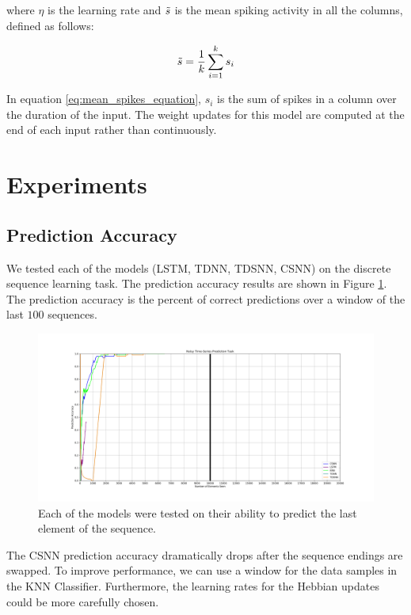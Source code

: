 \documentclass{article}
\begin{document}
where $\eta$ is the learning rate and $\Tilde{s}$ is the mean spiking activity in all the columns, defined as follows:

\begin{equation}
    \Tilde{s} = \frac{1}{k} \sum_{i = 1}^{k}{s_i}
    \label{eq:mean_spikes_equation}
\end{equation}

In equation \ref{eq:mean_spikes_equation}, $s_i$ is the sum of spikes in a column over the duration of the input. The weight updates for this model are computed at the end of each input rather than continuously.


\section*{Experiments}

\subsection*{Prediction Accuracy}

We tested each of the models (LSTM, TDNN, TDSNN, CSNN) on the discrete sequence learning task. The prediction accuracy results are shown in Figure \ref{fig:prediction-accuracy}. The prediction accuracy is the percent of correct predictions over a window of the last $100$ sequences.

\begin{figure}[!h]
    \centering
    \includegraphics[width=0.9\linewidth]{../results/artificial.png}
    \caption{Each of the models were tested on their ability to predict the last element of the sequence.}
    \label{fig:prediction-accuracy}
\end{figure}

The CSNN prediction accuracy dramatically drops after the sequence endings are swapped. To improve performance, we can use a window for the data samples in the KNN Classifier. Furthermore, the learning rates for the Hebbian updates could be more carefully chosen.
\end{document}
